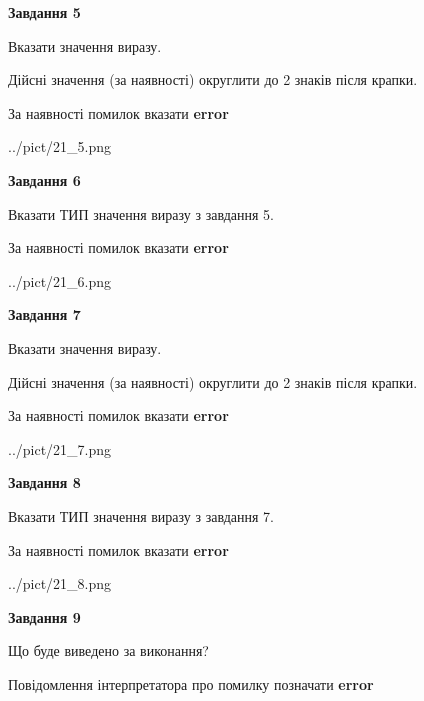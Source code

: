 \documentclass[11pt, ukrainian]{article}
\begin{document}
{\begin {large}
{\begin {center}\textbf{Завдання 5}\end {center}}\par
Вказати значення виразу. \par
Дійсні значення (за наявності) округлити до 2 знаків після крапки. \par
За наявності помилок вказати \textbf{error}

\begin{center}
	{../pict/21_5.png}
\end{center}
\newpage

{\begin {center}\textbf{Завдання 6}\end {center}}\par
Вказати ТИП значення виразу з завдання 5. \par
За наявності помилок вказати \textbf{error}

\begin{center}
	{../pict/21_6.png}
\end{center}
\newpage

{\begin {center}\textbf{Завдання 7}\end {center}}\par
Вказати значення виразу. \par
Дійсні значення (за наявності) округлити до 2 знаків після крапки. \par
За наявності помилок вказати \textbf{error}

\begin{center}
	{../pict/21_7.png}
\end{center}
\newpage

{\begin {center}\textbf{Завдання 8}\end {center}}\par
Вказати ТИП значення виразу з завдання 7. \par
За наявності помилок вказати \textbf{error}

\begin{center}
	{../pict/21_8.png}
\end{center}
\newpage

{\begin {center}\textbf{Завдання 9}\end {center}}\par
Що буде виведено за виконання? \par
Повідомлення інтерпретатора про помилку позначати \textbf{error}


\end{large}}
\end{document}
